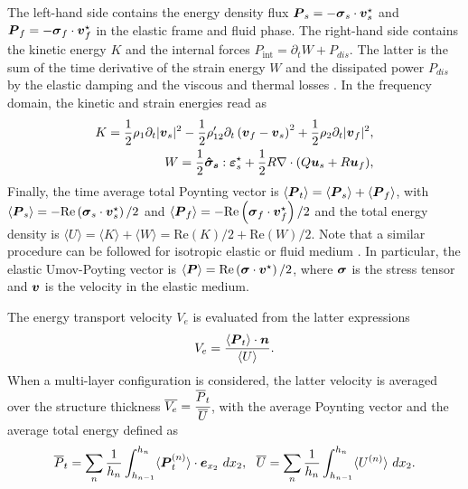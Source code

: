 The left-hand side contains the energy density flux $\boldsymbol P_s=-  \boldsymbol \sigma_s \cdot \boldsymbol v_s^\star$ and $\boldsymbol P_f=-  \boldsymbol \sigma_f \cdot \boldsymbol v_f^\star$ in the elastic frame and fluid phase. The right-hand side contains the kinetic energy $K$ \cite{allard2009} and the internal forces $P_{\text{int}}=\partial_t W+P_{dis}$. The latter is the sum of the time derivative of the strain energy $W$ and the dissipated power $P_{dis}$ by the elastic damping and the viscous and thermal losses \cite{dazel2008}. In the frequency domain, the kinetic and strain energies read as
   \begin{equation}
        \begin{aligned}
            K = \frac 1 2 \rho_1  \partial_t |\boldsymbol v_s|^2 - \frac 1 2 \rho_{12}' \partial_t\left(\boldsymbol v_f - \boldsymbol v_s \right)^2 +  \frac 1 2\rho_2 \partial_t|\boldsymbol v_f|^2, \\
            W = \frac 1 2 \boldsymbol{\hat \sigma_s}: \boldsymbol \varepsilon_s^\star + \frac 1 2 R \nabla \cdot ( Q  \boldsymbol u_s + R \boldsymbol u_f ),
        \end{aligned}
    \end{equation}
Finally, the time average total Poynting vector is $\langle \boldsymbol P_t \rangle=\langle \boldsymbol P_s \rangle+\langle \boldsymbol P_f\rangle$, with $\langle \boldsymbol P_s \rangle=-  \textrm{Re}\left(\boldsymbol \sigma_s \cdot \boldsymbol v_s^\star\right)/2 $ and $\langle \boldsymbol P_f\rangle =-  \textrm{Re}\left(\boldsymbol \sigma_f \cdot \boldsymbol v_f^\star \right)/2$ and the total energy density is $\langle U \rangle = \langle K \rangle+\langle W \rangle =  \text{Re}(K)/2 + \text{Re} (W)/2$. Note that a similar procedure can be followed for isotropic elastic or fluid medium \cite{royer2021}. In particular,  the elastic Umov-Poyting vector is $\langle \boldsymbol P \rangle=\textrm{Re}\left(\boldsymbol \sigma \cdot \boldsymbol v^\star\right)/2$, where $\boldsymbol \sigma$ is the stress tensor and $\boldsymbol v$ is the velocity in the elastic medium. 

The energy transport velocity $V_e$ is evaluated from the latter expressions
\begin{equation}
    V_e = \frac{\langle \boldsymbol P_t \rangle \cdot \boldsymbol n}{ \langle U \rangle}.
\end{equation}
When a multi-layer configuration is considered, the latter velocity is averaged over the structure thickness $\overline{V_e} = \cfrac {\overline{P}_t} {\overline U}$, with the average Poynting vector and the average total energy defined as
\begin{equation}
    \overline{P}_t = \sum_n \frac{1}{h_n} \int_{h_{n-1}}^{h_n} \langle\boldsymbol P_t^{(n)} \rangle\cdot \boldsymbol e_{x_2} ~dx_2, ~~
    \overline U = \sum_n \frac{1}{h_n} \int_{h_{n-1}}^{h_n} \langle U^{(n)} \rangle  ~dx_2.
    \label{eq:mean_energy}
\end{equation}
% 